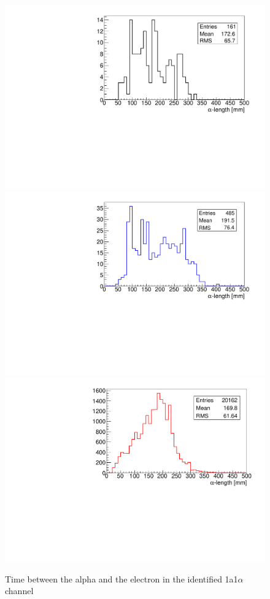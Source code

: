 \documentclass[main.tex]{subfiles}
\begin{document}
\begin{figure}[h!]
\begin{center}
\includegraphics[scale=0.39]{pictures/Chap5/length_alpha_tracker_selection_bulk.pdf}
\includegraphics[scale=0.39]{pictures/Chap5/length_alpha_tracker_selection_surface.pdf}
\includegraphics[scale=0.39]{pictures/Chap5/length_alpha_tracker_selection_tracker.pdf}
\caption{Time between the alpha and the electron in the identified 1a1$\alpha$ channel}
\label{alpha_length_tracker_selection}
\end{center}
\end{figure}
\end{document}
